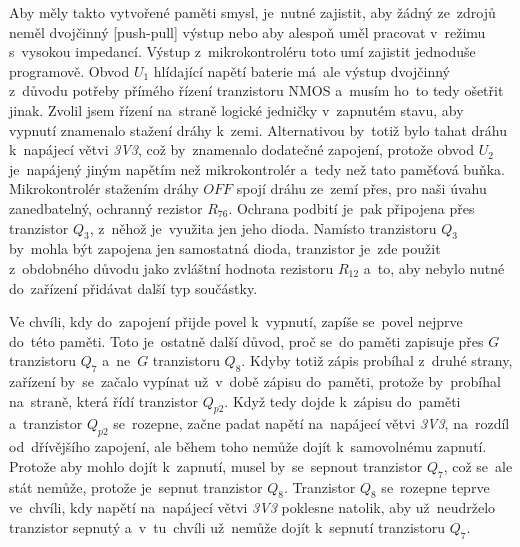 Aby měly takto vytvořené paměti smysl, je~nutné zajistit, aby žádný ze~zdrojů neměl dvojčinný [push-pull] výstup nebo aby alespoň uměl pracovat v~režimu s~vysokou impedancí.
Výstup z~mikrokontroléru toto umí zajistit jednoduše programově.
Obvod \(U_{1}\) hlídající napětí baterie má~ale výstup dvojčinný z~důvodu potřeby přímého řízení tranzistoru NMOS a~musím ho~to tedy ošetřit jinak.
Zvolil jsem řízení na~straně logické jedničky v~zapnutém stavu, aby vypnutí znamenalo stažení dráhy k~zemi.
Alternativou by~totiž bylo tahat dráhu k~napájecí větvi {\it 3V3}, což by~znamenalo dodatečné zapojení, protože obvod \(U_{2}\) je~napájený jiným napětím než mikrokontrolér a~tedy než tato paměťová buňka.
Mikrokontrolér stažením dráhy \(OFF\) spojí dráhu ze~zemí přes, pro naši úvahu zanedbatelný, ochranný rezistor \(R_{76}\).
Ochrana podbití je~pak připojena přes tranzistor \(Q_{3}\), z~něhož je~využita jen jeho dioda.
Namísto tranzistoru \(Q_{3}\) by~mohla být zapojena jen samostatná dioda, tranzistor je~zde použit z~obdobného důvodu jako zvláštní hodnota rezistoru \(R_{12}\) a~to, aby nebylo nutné do~zařízení přidávat další typ součástky.

Ve chvíli, kdy do~zapojení přijde povel k~vypnutí, zapíše se~povel nejprve do~této paměti.
Toto je~ostatně další důvod, proč se~do paměti zapisuje přes \(G\) tranzistoru \(Q_{7}\) a~ne~\(G\) tranzistoru \(Q_{8}\).
Kdyby totiž zápis probíhal z~druhé strany, zařízení by~se~začalo vypínat už~v~době zápisu do~paměti, protože by~probíhal na~straně, která řídí tranzistor \(Q_{p2}\).
Když tedy dojde k~zápisu do~paměti a~tranzistor \(Q_{p2}\) se~rozepne, začne padat napětí na~napájecí větvi {\it 3V3}, na~rozdíl od~dřívějšího zapojení, ale během toho nemůže dojít k~samovolnému zapnutí.
Protože aby mohlo dojít k~zapnutí, musel by~se~sepnout tranzistor \(Q_{7}\), což se~ale stát nemůže, protože je~sepnut tranzistor \(Q_{8}\). 
Tranzistor \(Q_{8}\) se~rozepne teprve ve~chvíli, kdy napětí na~napájecí větvi {\it 3V3} poklesne natolik, aby už~neudrželo tranzistor sepnutý a~v~tu~chvíli už~nemůže dojít k~sepnutí tranzistoru \(Q_{7}\).

